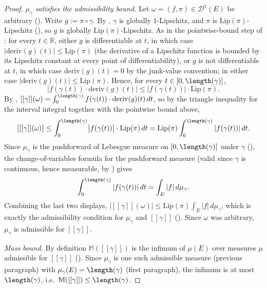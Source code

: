 \begin{proof}
  \emph{$\mu_\gamma$ satisfies the admissibility bound.} Let $\omega = (f,\pi) \in \mathcal{D}^1(E)$
  be arbitrary (). Write $g := \pi \circ \gamma$. By ,
  $\gamma$ is globally $1$-Lipschitz, and $\pi$ is $\mathrm{Lip}(\pi)$-Lipschitz
  (), so $g$ is globally $\mathrm{Lip}(\pi)$-Lipschitz. As in the pointwise-bound
  step of : for every $t \in \mathbb{R}$, either $g$ is differentiable at
  $t$, in which case $|\mathrm{deriv}(g)(t)| \le \mathrm{Lip}(\pi)$ (the derivative of a Lipschitz
  function is bounded by its Lipschitz constant at every point of differentiability), or $g$ is not
  differentiable at $t$, in which case $\mathrm{deriv}(g)(t) = 0$ by the junk-value convention; in
  either case $|\mathrm{deriv}(g)(t)| \le \mathrm{Lip}(\pi)$. Hence, for every
  $t \in [0,\length(\gamma)]$,
  \[
    \bigl| f(\gamma(t)) \cdot \mathrm{deriv}(g)(t) \bigr| \le |f(\gamma(t))| \cdot \mathrm{Lip}(\pi)
    .
  \]
  By , $[[\gamma]](\omega) = \int_0^{\length(\gamma)} f(\gamma(t)) \cdot
  \mathrm{deriv}(g)(t) \, dt$, so by the triangle inequality for the interval integral together with
  the pointwise bound above,
  \[
    \bigl| [[\gamma]](\omega) \bigr|
    \le \int_0^{\length(\gamma)} \bigl| f(\gamma(t)) \bigr| \cdot \mathrm{Lip}(\pi) \, dt
    = \mathrm{Lip}(\pi) \int_0^{\length(\gamma)} |f(\gamma(t))| \, dt
    .
  \]
  Since $\mu_\gamma$ is the pushforward of Lebesgue measure on $[0,\length(\gamma)]$ under $\gamma$
  (), the change-of-variables formula for the pushforward measure (valid since
  $\gamma$ is continuous, hence measurable, by ) gives
  \[
    \int_0^{\length(\gamma)} |f(\gamma(t))| \, dt = \int_E |f| \, d\mu_\gamma
    .
  \]
  Combining the last two displays, $|[[\gamma]](\omega)| \le \mathrm{Lip}(\pi) \int_E |f| \,
  d\mu_\gamma$, which is exactly the admissibility condition for $\mu_\gamma$ and $[[\gamma]]$
  (). Since $\omega$ was arbitrary, $\mu_\gamma$ is admissible for $[[\gamma]]$.

  \emph{Mass bound.} By definition $\mathbb{M}([[\gamma]])$ is the infimum of $\mu(E)$ over measures
  $\mu$ admissible for $[[\gamma]]$ (). Since $\mu_\gamma$ is one such
  admissible measure (previous paragraph) with $\mu_\gamma(E) = \length(\gamma)$ (first paragraph),
  the infimum is at most $\length(\gamma)$, i.e.\ $\mathbb{M}([[\gamma]]) \le \length(\gamma)$.
\end{proof}

